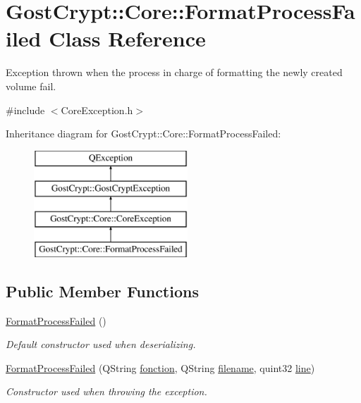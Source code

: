 \hypertarget{class_gost_crypt_1_1_core_1_1_format_process_failed}{}\section{Gost\+Crypt\+:\+:Core\+:\+:Format\+Process\+Failed Class Reference}
\label{class_gost_crypt_1_1_core_1_1_format_process_failed}


Exception thrown when the process in charge of formatting the newly created volume fail.  




{\ttfamily \#include $<$Core\+Exception.\+h$>$}

Inheritance diagram for Gost\+Crypt\+:\+:Core\+:\+:Format\+Process\+Failed\+:\begin{figure}[H]
\begin{center}
\leavevmode
\includegraphics[height=4.000000cm]{class_gost_crypt_1_1_core_1_1_format_process_failed}
\end{center}
\end{figure}
\subsection*{Public Member Functions}
\begin{DoxyCompactItemize}
\item 
\hyperlink{class_gost_crypt_1_1_core_1_1_format_process_failed_a1a7a01bd1e9613a358dd6460825866da}{Format\+Process\+Failed} ()
\begin{DoxyCompactList}\small\item\em Default constructor used when deserializing. \end{DoxyCompactList}\item 
\hyperlink{class_gost_crypt_1_1_core_1_1_format_process_failed_a2173de3ee129439e41d03faf33bbefa4}{Format\+Process\+Failed} (Q\+String \hyperlink{class_gost_crypt_1_1_gost_crypt_exception_a29b8c93d5efbb1ff369107385725a939}{fonction}, Q\+String \hyperlink{class_gost_crypt_1_1_gost_crypt_exception_a749a12375f4ba9d502623b99d8252f38}{filename}, quint32 \hyperlink{class_gost_crypt_1_1_gost_crypt_exception_abf506d911f12a4e969eea500f90bd32c}{line})
\begin{DoxyCompactList}\small\item\em Constructor used when throwing the exception. \end{DoxyCompactList}\end{DoxyCompactItemize}
